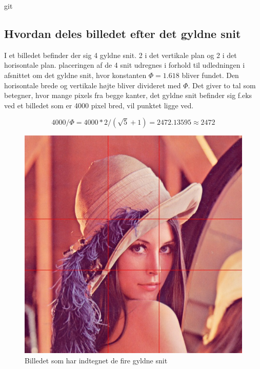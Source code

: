 git %


\subsection*{Hvordan deles billedet efter det gyldne snit}
I et billedet befinder der sig 4 gyldne snit. 2 i det vertikale plan og
2 i det horisontale plan. placeringen af de 4 snit udregnes i forhold
til udledningen i afsnittet om det gyldne snit, hvor konstanten $\varPhi
= 1.618$ bliver fundet. Den horisontale brede og vertikale højte bliver
divideret med $\varPhi$. Det giver to tal som betegner, hvor mange
pixels fra begge kanter, det gyldne snit befinder sig f.eks ved et
billedet som er 4000 pixel bred, vil punktet ligge ved.

\begin{equation}
	4000/\varPhi = 4000*2/(\sqrt{5}+1) = 2472.13595 \approx 2472
\end{equation}

\begin{figure}[h]
	\begin{center}
		\includegraphics[scale=0.42,angle=0]{afsnit/vores_implementation/billeder/naiv_algoritme/Lenagolden}
	\end{center}
	\caption[]{Billedet som har indtegnet de fire gyldne snit}
	\label{lenasnit}
\end{figure}

